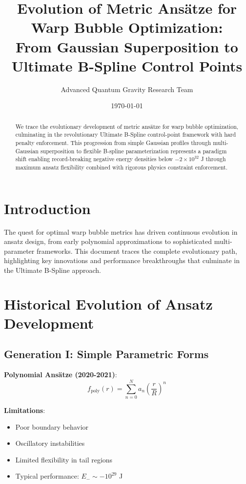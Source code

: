 \documentclass[11pt,a4paper]{article}
\title{Evolution of Metric Ansätze for Warp Bubble Optimization:\\
From Gaussian Superposition to Ultimate B-Spline Control Points}
\author{Advanced Quantum Gravity Research Team}
\date{\today}
\begin{document}
\maketitle

\begin{abstract}
We trace the evolutionary development of metric ansätze for warp bubble optimization, culminating in the revolutionary Ultimate B-Spline control-point framework with hard penalty enforcement. This progression from simple Gaussian profiles through multi-Gaussian superposition to flexible B-spline parameterization represents a paradigm shift enabling record-breaking negative energy densities below $-2 \times 10^{32}$ J through maximum ansatz flexibility combined with rigorous physics constraint enforcement.
\end{abstract}

\section{Introduction}

The quest for optimal warp bubble metrics has driven continuous evolution in ansatz design, from early polynomial approximations to sophisticated multi-parameter frameworks. This document traces the complete evolutionary path, highlighting key innovations and performance breakthroughs that culminate in the Ultimate B-Spline approach.

\section{Historical Evolution of Ansatz Development}

\subsection{Generation I: Simple Parametric Forms}

\textbf{Polynomial Ansätze (2020-2021)}:
\begin{equation}
f_{\text{poly}}(r) = \sum_{n=0}^{N} a_n \left(\frac{r}{R}\right)^n
\end{equation}

\textbf{Limitations}:
\begin{itemize}
\item Poor boundary behavior
\item Oscillatory instabilities
\item Limited flexibility in tail regions
\item Typical performance: $E_- \sim -10^{29}$ J
\end{itemize}
\end{document}
